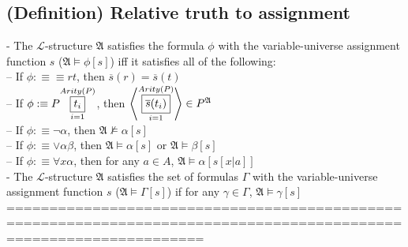 \documentclass{book}
\newcommand{\is}{:\equiv}
\newcommand{\inot}{\not}
\newcommand{\means}[2]{#1^{#2}}
\newcommand{\extend}[1]{\overline{#1}}
\newcommand{\seq}[1]{\left\langle #1 \right\rangle}
\newcommand{\vdc}[3]{\underset{#2}{\overset{#3}{\fbox{$#1$}}}}
\begin{document}
\subsection{(Definition) Relative truth to assignment} %
	- The $\mathcal{L}$-structure $\mathfrak{A}$ satisfies the formula $\phi$ with the variable-universe assignment function $s$ ($\mathfrak{A} \vDash \phi[s]$) iff it satisfies all of the following: \\
		-- If $\phi \is \equiv r t$, then $\extend{s}(r) = \extend{s}(t)$ \\
		-- If $\phi \is P \vdc{t_i}{i=1}{Arity(P)}$, then $\seq{\vdc{\extend{s}(t_i)}{i=1}{Arity(P)}} \in \means{P}{\mathfrak{A}}$ \\
		-- If $\phi \is \lnot \alpha$, then $\mathfrak{A} \inot \vDash \alpha[s]$ \\
		-- If $\phi \is \lor \alpha \beta$, then $\mathfrak{A} \vDash \alpha[s]$ or $\mathfrak{A} \vDash \beta[s]$ \\
		-- If $\phi \is \forall x \alpha$, then for any $a \in A$, $\mathfrak{A} \vDash \alpha[s[x|a]]$ \\
	- The $\mathcal{L}$-structure $\mathfrak{A}$ satisfies the set of formulas $\Gamma$ with the variable-universe assignment function $s$ ($\mathfrak{A} \vDash \Gamma[s]$) if for any $\gamma \in \Gamma$, $\mathfrak{A} \vDash \gamma[s]$ \\
	===================================================================================================================
\end{document}
